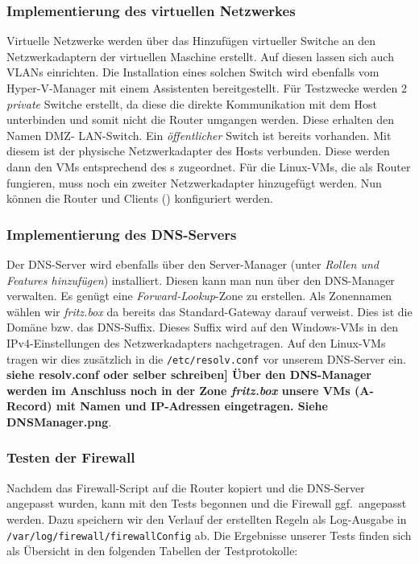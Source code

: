 \subsubsection{Implementierung des virtuellen Netzwerkes}
Virtuelle Netzwerke werden über das Hinzufügen virtueller Switche an den Netzwerkadaptern der virtuellen Maschine erstellt. Auf diesen lassen sich auch \ac{VLAN}s einrichten.
Die Installation eines solchen Switch wird ebenfalls vom Hyper-V-Manager mit einem Assistenten bereitgestellt. Für Testzwecke werden 2 \textit{private} Switche erstellt, da diese die direkte Kommunikation mit dem Host unterbinden und somit nicht die Router umgangen werden. Diese erhalten den Namen \ac{DMZ}- \bzw \ac{LAN}-Switch. Ein \textit{öffentlicher} Switch ist bereits vorhanden. Mit diesem ist der physische Netzwerkadapter des Hosts verbunden. Diese werden dann den \ac{VM}s entsprechend des s zugeordnet. Für die Linux-\ac{VM}s, die als Router fungieren, muss \evtl noch ein zweiter Netzwerkadapter hinzugefügt werden. Nun können die Router und Clients () konfiguriert werden.

\subsubsection{Implementierung des \ac{DNS}-Servers}
Der \ac{DNS}-Server wird ebenfalls über den Server-Manager (unter \textit{Rollen und Features hinzufügen}) installiert. Diesen kann man nun über den \ac{DNS}-Manager verwalten. Es genügt eine \textit{Forward-Lookup}-Zone zu erstellen. Als Zonennamen wählen wir \textit{fritz.box} da bereits das Standard-Gateway darauf verweist. Dies ist die Domäne bzw. das \ac{DNS}-Suffix. Dieses Suffix wird auf den Windows-\ac{VM}s in den \ac{IP}v4-Einstellungen des Netzwerkadapters nachgetragen. Auf den Linux-\ac{VM}s tragen wir dies zusätzlich in die \verb+/etc/resolv.conf+ vor unserem \ac{DNS}-Server ein. \textbf{siehe resolv.conf oder selber schreiben]
Über den \ac{DNS}-Manager werden im Anschluss noch in der Zone \textit{fritz.box} unsere \ac{VM}s (A-Record) mit Namen und \ac{IP}-Adressen eingetragen. \textbf Siehe \ac{DNS}Manager.png}.

\subsubsection{Testen der Firewall}
Nachdem das Firewall-Script auf die Router kopiert und die \ac{DNS}-Server angepasst wurden, kann mit den Tests begonnen und die Firewall ggf.\ angepasst werden. Dazu speichern wir den Verlauf der erstellten Regeln als Log-Ausgabe in \verb+/var/log/firewall/firewallConfig+ ab. Die Ergebnisse unserer Tests finden sich als Übersicht in den folgenden Tabellen der Testprotokolle:


